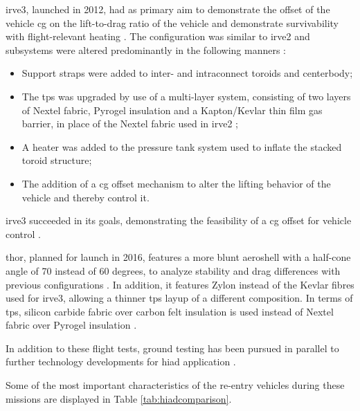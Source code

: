 \gls{irve3}, launched in 2012, had as primary aim to demonstrate the offset of the vehicle \gls{cg} on the lift-to-drag ratio of the vehicle and demonstrate survivability with flight-relevant heating \cite{Dillman2012a}. The configuration was similar to \gls{irve2} and subsystems were altered predominantly in the following  manners \cite{Dillman2012a}:
\begin{itemize}
\item Support straps were added to inter- and intraconnect toroids and centerbody;
\item The \acrfull{tps} was upgraded by use of a multi-layer system, consisting of two layers of Nextel fabric, Pyrogel insulation and a Kapton/Kevlar thin film gas barrier, in place of the Nextel fabric used in \gls{irve2} \cite{Dillman2012}; 
\item A heater was added to the pressure tank system used to inflate the stacked toroid structure;
\item The addition of a \gls{cg} offset mechanism to alter the lifting behavior of the vehicle and thereby control it.
\end{itemize}
\gls{irve3} succeeded in its goals, demonstrating the feasibility of a \gls{cg} offset for vehicle control \cite{Dillman2012}.

\gls{thor}, planned for launch in 2016, features a more blunt aeroshell with a half-cone angle of 70 instead of 60 degrees, to analyze stability and drag differences with previous configurations \cite{Hughes2005, Dillman2010, Dillman2012, Dillman2014}. In addition, it features Zylon instead of the Kevlar fibres used for \gls{irve3}, allowing a thinner \gls{tps} layup of a different composition. In terms of \gls{tps}, silicon carbide fabric over carbon felt insulation is used instead of Nextel fabric over Pyrogel insulation \cite{Dillman2014}.

In addition to these flight tests, ground testing has been pursued in parallel to further technology developments for \gls{hiad} application \cite{Smith2010}.

Some of the most important characteristics of the re-entry vehicles during these missions are displayed in Table \ref{tab:hiadcomparison}.


